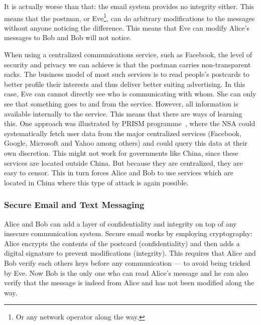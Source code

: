 It is actually worse than that: the email system provides no integrity either.
This means that the postman, or Eve\footnote{%
  Or any network operator along the way.
}, can do arbitrary modifications to the messages without anyone noticing the 
difference.
This means that Eve can modify Alice's messages to Bob and Bob will not notice.

When using a centralized communications service, such as Facebook, the
level of security and privacy we can achieve is that the postman
carries non-transparent sacks.  The business model of most such
services is to read people's postcards to better profile their
interests and thus deliver better suiting advertising.
In this case, Eve can cannot directly see who is communicating with whom.
She can only see that something goes to and from the service.
However, all information is available
internally to the service.  This means that there are ways of learning
this.
One approach was illustrated by  PRISM programme~\cite{Prism}, where 
the \ac{NSA} could systematically fetch user data from the major centralized 
services (Facebook, Google, Microsoft and Yahoo among others) and could query 
this data at their own discretion.
This might not work for governments like China, since these services are 
located outside China.
But because they are centralized, they are easy to censor.
This in turn forces Alice and Bob to use services which are located in China where this 
type of attack is again possible.

\subsubsection{Secure Email and Text Messaging}

Alice and Bob can add a layer of confidentiality and integrity on top of any 
insecure communication system.
Secure email works by employing cryptography: Alice encrypts the contents of 
the postcard (confidentiality) and then adds a digital signature to prevent 
modifications (integrity).
This requires that Alice and Bob verify each others keys before any 
communication --- to avoid being tricked by Eve.
Now Bob is the only one who can read Alice's message and he can also verify 
that the message is indeed from Alice and has not been modified along the way.

